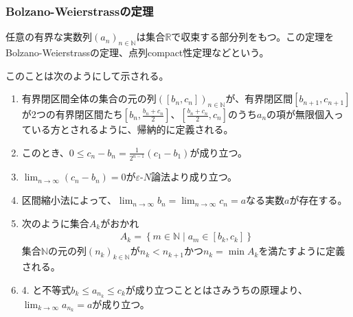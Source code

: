\documentclass[dvipdfmx]{jsarticle}
\begin{document}
\subsubsection{Bolzano-Weierstrassの定理}%
\begin{thm}\label{4.1.5.7}
任意の有界な実数列$\left( a_{n} \right)_{n \in \mathbb{N}}$は集合$\mathbb{R}$で収束する部分列をもつ。この定理をBolzano-Weierstrassの定理、点列compact性定理などという。
\end{thm}\par
このことは次のようにして示される。
\begin{enumerate}
\item
  有界閉区間全体の集合の元の列$\left( \left[ b_{n},c_{n} \right] \right)_{n \in \mathbb{N}}$が、有界閉区間$\left[ b_{n + 1},c_{n + 1} \right]$が2つの有界閉区間たち$\left[ b_{n},\frac{b_{n} + c_{n}}{2} \right]$、$\left[ \frac{b_{n} + c_{n}}{2},c_{n} \right]$のうち$a_{n}$の項が無限個入っている方とされるように、帰納的に定義される。
\item
  このとき、$0 \leq c_{n} - b_{n} = \frac{1}{2^{n - 1}}\left( c_{1} - b_{1} \right)$が成り立つ。
\item
  $\lim_{n \rightarrow \infty}\left( c_{n} - b_{n} \right) = 0$が$\varepsilon$-$N$論法より成り立つ。
\item
  区間縮小法によって、$\lim_{n \rightarrow \infty}b_{n} = \lim_{n \rightarrow \infty}c_{n} = a$なる実数$a$が存在する。
\item
  次のように集合$A_{k}$がおかれ
\begin{align*}
A_{k} = \left\{ m \in \mathbb{N} \middle| a_{m} \in \left[ b_{k},c_{k} \right] \right\}
\end{align*}
集合$\mathbb{N}$の元の列$\left( n_{k} \right)_{k \in \mathbb{N}}$が$n_{k} < n_{k + 1}$かつ$n_{k} = \min A_{k}$を満たすように定義される。
\item
  4. と不等式$b_{k} \leq a_{n_{k}} \leq c_{k}$が成り立つこととはさみうちの原理より、$\lim_{k \rightarrow \infty}a_{n_{k}} = a$が成り立つ。
\end{enumerate}
\end{document}
